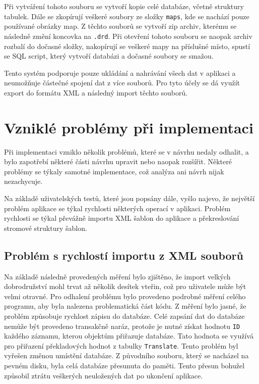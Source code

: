 \documentclass[thesis=B,czech]{resources/FITthesis}[2012/06/26]
\begin{document}
Při vytváření tohoto souboru se vytvoří kopie celé databáze, včetně struktury tabulek. Dále se zkopírují veškeré soubory ze složky \texttt{maps}, kde se nachází pouze používané obrázky map. Z těchto souborů se vytvoří zip archiv, kterému se následně změní koncovka na \texttt{.drd}. Při otevření tohoto souboru se naopak archiv rozbalí do dočasné složky, nakopírují se veškeré mapy na příslušné místo, spustí se SQL script, který vytvoří databázi a dočasné soubory se smažou. \par

Tento systém podporuje pouze ukládání a nahrávání všech dat v aplikaci a neumožňuje částečné spojení dat z více souborů. Pro tyto účely se dá využít export do formátu XML a následný import těchto souborů. 


\section{Vzniklé problémy při implementaci}
\label{problemy_implementace}
Při implementaci vzniklo několik problémů, které se v návrhu nedaly odhalit, a bylo zapotřebí některé části návrhu upravit nebo naopak rozšířit. Některé problémy se týkaly samotné implementace, což analýza ani návrh nijak nezachycuje. \par 

Na základě uživatelských testů, které jsou popsány dále, vyšlo najevo, že největší problém aplikace se týkal rychlosti některých operací v aplikaci. Problém rychlosti se týkal převážně importu XML šablon do aplikace a překreslování stromové struktury šablon.

	\subsection{Problém s rychlostí importu z XML souborů}
Na základě následně provedených měření bylo zjištěno, že import velkých dobrodružství mohl trvat až několik desítek vteřin, což pro uživatele může být velmi otravné. Pro odhalení problému bylo provedeno podrobné měření celého programu, aby byla nalezena problematická část kódu. Z měření bylo jasné, že problém způsobuje rychlost zápisu do databáze. Celé zapsání dat do databáze nemůže být provedeno transakčně naráz, protože je nutné získat hodnotu \texttt{ID} každého záznamu, kterou objektům přiřazuje databáze. Tato hodnota se využívá pro přiřazení překladových hodnot z tabulky \texttt{Translate}. Tento problém byl vyřešen změnou umístění databáze. Z původního souboru, který se nacházel na pevném disku, byla celá databáze přesunuta do paměti. Tento přesun bohužel způsobil ztrátu veškerých neuložených dat po ukončení aplikace. \par 
\end{document}
